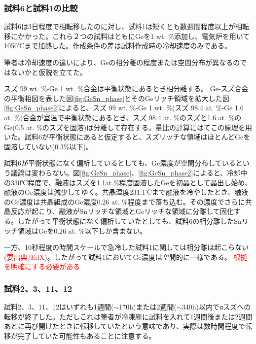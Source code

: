 \subsubsection{試料6と試料1の比較}
試料6は3日程度で相転移したのに対し、試料1は短くとも数週間程度以上が相転移にかかった。これら２つの試料はともにGeを1 wt. \%添加し、電気炉を用いて1050℃まで加熱した。作成条件の差は試料作成時の冷却速度のみである。

筆者は冷却速度の違いにより、Geの相分離の程度または空間分布が異なるのではないかと仮説を立てた。

スズ 99 wt. \%-Ge 1 wt. \%合金は平衡状態にあるとき相分離する。
Ge-スズ合金の平衡相図を表した図\ref{fig:GeSn_phase}とそのGeリッチ領域を拡大した図\ref{fig:GeSn_phase2}によると、スズ 99 wt. \%-Ge 1 wt. \%(スズ 98.4 at. \%-Ge 1.6 at. \%)合金が室温で平衡状態にあるとき、スズ 98.4 at. \%のスズと1.6 at. \%のGe(0.5 at. \%のスズを固溶)は分離して存在する。量比の計算にはてこの原理を用いた。試料6が平衡状態にあると仮定すると、スズリッチな領域はほとんどGeを固溶していない(0.3\%以下\cite{Thurmond1960})。

試料6が平衡状態になく偏析しているとしても、Ge濃度が空間分布しているという議論は変わらない。図\ref{fig:GeSn_phase}、\ref{fig:GeSn_phase2}によると、冷却中の330℃程度で、融液はスズを1.1at.\%程度固溶したGeを初晶として晶出し始め、融液のGe濃度は減少してゆく。共晶温度231.1℃まで融液を冷やしたとき、融液のGe濃度は共晶組成のGe濃度0.26 at. \%程度\cite{Thurmond1960}まで落ち込む。その濃度でさらに共晶反応が起こり、融液がSnリッチな領域とGeリッチな領域に分離して固化する。したがって平衡状態になく偏析していたとしても、試料6の相分離したSnリッチ領域はGeを0.26 at. \%以下しか含まない。

一方、10秒程度の時間スケールで急冷した試料1に関しては相分離は起こらない(\textcolor{red}{要出典/EdX})。したがって試料1においてGe濃度は空間的に一様である。
\textcolor{red}{根拠を明確にする必要がある}

\subsubsection{試料2、3、11、12}
試料2、3、11、12はいずれも1週間($\sim$170h)または2週間($\sim$340h)以内でαスズへの転移が終了した。ただしこれは筆者が冷凍庫に試料を入れて1週間後または2週間あとに再び開けたときに転移していたという意味であり、実際は数時間程度で転移が完了していた可能性もあることに注意する。

